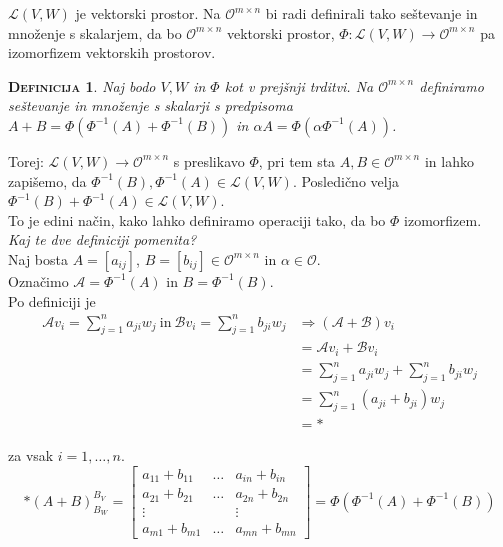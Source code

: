 \documentclass[a4paper,12pt]{article}
\newcommand{\OO}{\mathcal{O}}
\newtheorem*{definicija}{\textsc{Definicija}}
\begin{document}
$\mathcal{L}(V,W)$ je vektorski prostor.
Na $\mathcal{O}^{m\times n}$ bi radi definirali tako seštevanje in množenje s skalarjem, da bo $\mathcal{O}^{m\times n}$ vektorski prostor, $\Phi: \mathcal{L}(V,W)\to \mathcal{O}^{m\times n}$ pa izomorfizem vektorskih prostorov.\\

\begin{definicija}
	Naj bodo $V,W$ in $\Phi$ kot v prejšnji trditvi. Na $\mathcal{O}^{m\times n}$ definiramo seštevanje in množenje s skalarji s predpisoma $A+B=\Phi(\Phi^{-1}(A)+\Phi^{-1}(B))$ in $\alpha A=\Phi(\alpha \Phi^{-1}(A))$. \\
\end{definicija}

Torej: $\mathcal{L}(V,W) \to \mathcal{O}^{m\times n}$ s preslikavo $\Phi$, pri tem sta $A,B\in \mathcal{O}^{m\times n}$ in lahko zapišemo, da $\Phi^{-1}(B), \Phi^{-1}(A) \in \mathcal{L}(V,W)$. Posledično velja $\Phi^{-1}(B)+\Phi^{-1}(A) \in \mathcal{L}(V,W)$. \\

To je edini način, kako lahko definiramo operaciji tako, da bo $\Phi$ izomorfizem.\\

\textit{Kaj te dve definiciji pomenita?}\\

Naj bosta $A=[a_{ij}]$, $B=[b_{ij}] \in \mathcal{O}^{m\times n}$ in $\alpha  \in \OO$. \\

Označimo $\mathcal{A}=\Phi^{-1}(A)$ in $B=\Phi^{-1}(B)$. \\

Po definiciji je
\begin{align*}
	 \mathcal{A}v_i=\sum_{j=1}^n a_{ji}w_j~\text{in}~\mathcal{B}v_i=\sum_{j=1}^n b_{ji}w_j &\Rightarrow (\mathcal{A}+\mathcal{B})v_i \\
	 &=\mathcal{A}v_i + \mathcal{B}v_i \\
	 &= \sum_{j=1}^n a_{ji}w_j + \sum_{j=1}^n
b_{ji}w_j \\
	&= \sum_{j=1}^n(a_{ji}+b_{ji})w_j \\
	&= *
\end{align*}

za vsak $i=1,\ldots,n$. \\

$$* (A+B)^{B_V}_{B_W}=
\begin{bmatrix}
	a_{11}+b_{11}&\ldots&a_{in}+b_{in} \\
	a_{21}+b_{21}&\ldots&a_{2n}+b_{2n} \\
	\vdots&~&\vdots \\
	a_{m1}+b_{m1}&\ldots&a_{mn}+b_{mn}
\end{bmatrix} 
= \Phi(\Phi^{-1}(A)+\Phi^{-1}(B))$$ \\
\end{document}
